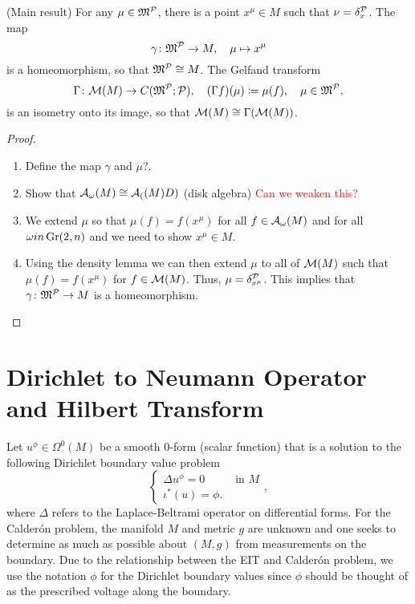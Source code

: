 \documentclass[12pt]{article}
\begin{document}
\begin{theorem}
(Main result) For any $\mu \in \mathfrak{M}^{\mathcal{P}}$, there is a point $x^\mu \in M$ such that $\nu = \delta_x^{\mathcal{P}}$. The map
\[
\gamma \colon \mathfrak{M}^{\mathcal{P}} \to M, \quad \mu \mapsto x^\mu
\]
is a homeomorphism, so that $\mathfrak{M}^{\mathcal{P}} \cong M$. The Gelfand transform
\[
\Gamma \colon \mathcal{M}(M) \to C(\mathfrak{M}^{\mathcal{P}}; \mathcal{P}), \quad (\Gamma f)(\mu) \coloneqq \mu(f), \quad \mu \in \mathfrak{M}^{\mathcal{P}},
\]
is an isometry onto its image, so that $\mathcal{M}(M) \cong \Gamma(\mathcal{M}(M))$.
\end{theorem}
\begin{proof}~
    \begin{enumerate}[1.]
        \item Define the map $\gamma$ and $\mu$?.
        \item Show that $\mathcal{A}_{\omega}(M) \cong \mathcal{A}_{(}(M)D)$ (disk algebra) \textcolor{red}{Can we weaken this?} 
        \item We extend $\mu$ so that $\mu(f) = f(x^\mu)$ for all $f\in \mathcal{A}_{\omega}(M)$ and for all $\omega in \operatorname{Gr}(2,n)$ and we need to show $x^\mu \in M$.
        \item Using the density lemma we can then extend $\mu$ to all of $\mathcal{M}(M)$ such that $\mu(f)=f(x^\mu)$ for $f\in \mathcal{M}(M)$.  Thus, $\mu = \delta_{x^\mu}^{\mathcal{P}}$.  This implies that $\gamma \colon \mathfrak{M}^{\mathcal{P}} \to M$ is a homeomorphism.
    \end{enumerate}
\end{proof}



\section{Dirichlet to Neumann Operator and Hilbert Transform}

Let $u^\phi \in \Omega^0(M)$ be a smooth 0-form (scalar function) that is a solution to the following Dirichlet boundary value problem
\begin{equation}
\label{eq:dirichlet_problem}
\begin{cases} \Delta u^\phi = 0 & \textrm{ in $M$} \\  \iota^*( u) = \phi. \end{cases},
\end{equation}
where $\Delta$ refers to the Laplace-Beltrami operator on differential forms. For the Calder\'on problem, the manifold $M$ and metric $g$ are unknown and one seeks to determine as much as possible about $(M,g)$ from measurements on the boundary.  Due to the relationship between the EIT and Calder\'on problem, we use the notation $\phi$ for the Dirichlet boundary values since $\phi$ should be thought of as the prescribed voltage along the boundary. 
\end{document}

